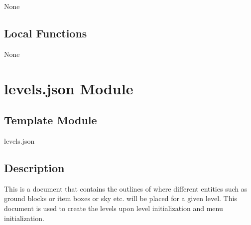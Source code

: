 \documentclass[12pt]{article}
\begin{document}
None

\subsection* {Local Functions}

None

\newpage

\section* {levels.json Module}

\subsection*{Template Module}

levels.json

\subsection* {Description}

This is a document that contains the outlines of where different entities such as ground blocks or item boxes or sky etc. will be placed for a given level. This document is used to create the levels upon level initialization and menu initialization.
\end{document}
